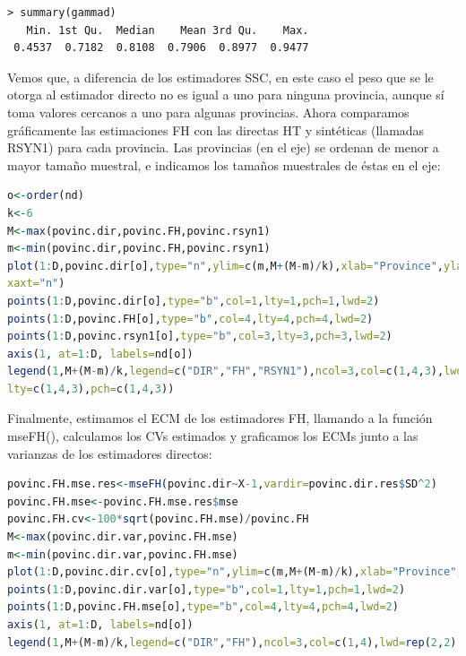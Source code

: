 \documentclass[12pt,spanish]{article}
\begin{document}
\begin{lstlisting}
> summary(gammad) 
   Min. 1st Qu.  Median    Mean 3rd Qu.    Max. 
 0.4537  0.7182  0.8108  0.7906  0.8977  0.9477 
\end{lstlisting}

Vemos que, a diferencia de los estimadores SSC, en este caso el peso que se le otorga al estimador directo no es igual a uno para ninguna provincia, aunque sí toma valores cercanos a uno para algunas provincias.  Ahora comparamos gráficamente las estimaciones FH con las directas HT y sintéticas (llamadas RSYN1) para cada provincia. Las provincias (en el eje) se ordenan de menor a mayor tamaño muestral, e indicamos los tamaños muestrales de éstas en el eje: 

\begin{lstlisting}[language=R]
o<-order(nd) 
k<-6 
M<-max(povinc.dir,povinc.FH,povinc.rsyn1) 
m<-min(povinc.dir,povinc.FH,povinc.rsyn1) 
plot(1:D,povinc.dir[o],type="n",ylim=c(m,M+(M-m)/k),xlab="Province",ylab="Estimator", 
xaxt="n") 
points(1:D,povinc.dir[o],type="b",col=1,lty=1,pch=1,lwd=2) 
points(1:D,povinc.FH[o],type="b",col=4,lty=4,pch=4,lwd=2) 
points(1:D,povinc.rsyn1[o],type="b",col=3,lty=3,pch=3,lwd=2) 
axis(1, at=1:D, labels=nd[o]) 
legend(1,M+(M-m)/k,legend=c("DIR","FH","RSYN1"),ncol=3,col=c(1,4,3),lwd=rep(2,3), 
lty=c(1,4,3),pch=c(1,4,3)) 
\end{lstlisting}
Finalmente, estimamos el ECM de los estimadores FH, llamando a la función mseFH(), calculamos los CVs estimados y graficamos los ECMs junto a las varianzas de los estimadores directos:  
\begin{lstlisting}[language=R]
povinc.FH.mse.res<-mseFH(povinc.dir~X-1,vardir=povinc.dir.res$SD^2) 
povinc.FH.mse<-povinc.FH.mse.res$mse 
povinc.FH.cv<-100*sqrt(povinc.FH.mse)/povinc.FH 
M<-max(povinc.dir.var,povinc.FH.mse) 
m<-min(povinc.dir.var,povinc.FH.mse) 
plot(1:D,povinc.dir.cv[o],type="n",ylim=c(m,M+(M-m)/k),xlab="Province",ylab="CV",xaxt="n") 
points(1:D,povinc.dir.var[o],type="b",col=1,lty=1,pch=1,lwd=2) 
points(1:D,povinc.FH.mse[o],type="b",col=4,lty=4,pch=4,lwd=2) 
axis(1, at=1:D, labels=nd[o]) 
legend(1,M+(M-m)/k,legend=c("DIR","FH"),ncol=3,col=c(1,4),lwd=rep(2,2),lty=c(1,4),pch=c(1,4))
\end{lstlisting}
\end{document}
